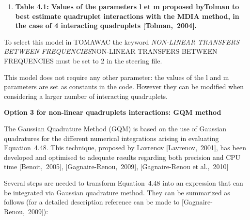 \begin{enumerate}
\item  \textbf{Table 4.1: Values of the parameters l et m proposed byTolman to best estimate quadruplet interactions with the MDIA method, in the case of 4 interacting quadruplets [Tolman,~2004].}
\end{enumerate}

 To select this model in TOMAWAC the keyword \textit{NON-LINEAR TRANSFERS BETWEEN FREQUENCIES}NON-LINEAR TRANSFERS BETWEEN FREQUENCIES must be set to 2 in the steering file.

 This model does not require any other parameter: the values of the l and m parameters are set as constants in the code. However they can be modified when considering a larger number of interacting quadruplets.


{\bf  Option 3 for non-linear quadruplets interactions: GQM method}

 The Gaussian Quadrature Method (GQM) is based on the use of Gaussian quadratures for the different numerical integrations arising in evaluating Equation~4.48. This technique, proposed by Lavrenov [Lavrenov,~2001], has been developed and optimised to adequate results regarding both precision and CPU time [Benoit,~2005], [Gagnaire-Renou,~2009], [Gagnaire-Renou et al.,~2010]

 Several steps are needed to transform Equation~4.48 into an expression that can be integrated via Gaussian quadrature method. They can be summarized as follows (for a detailed description reference can be made to [Gagnaire-Renou,~2009]):

